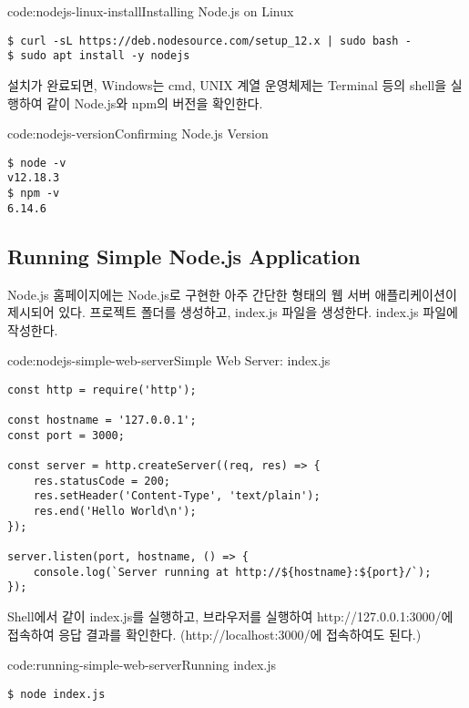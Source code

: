 \begin{codeenv}{code:nodejs-linux-install}{Installing Node.js on Linux}\begin{verbatim}
$ curl -sL https://deb.nodesource.com/setup_12.x | sudo bash -
$ sudo apt install -y nodejs
\end{verbatim}
\end{codeenv}

설치가 완료되면, Windows는 cmd, UNIX 계열 운영체제는 Terminal 등의 shell을 실행하여 \과 같이 Node.js와 npm의 버전을 확인한다.

\begin{codeenv}{code:nodejs-version}{Confirming Node.js Version}\begin{verbatim}
$ node -v
v12.18.3
$ npm -v
6.14.6
\end{verbatim}
\end{codeenv}

\subsection*{Running Simple Node.js Application}
Node.js 홈페이지에는 Node.js로 구현한 아주 간단한 형태의 웹 서버 애플리케이션이 제시되어 있다. 프로젝트 폴더를 생성하고, index.js 파일을 생성한다. index.js 파일에 \를 작성한다.

\begin{codeenv}{code:nodejs-simple-web-server}{Simple Web Server: index.js}\begin{verbatim}
const http = require('http');

const hostname = '127.0.0.1';
const port = 3000;

const server = http.createServer((req, res) => {
    res.statusCode = 200;
    res.setHeader('Content-Type', 'text/plain');
    res.end('Hello World\n');
});

server.listen(port, hostname, () => {
    console.log(`Server running at http://${hostname}:${port}/`);
});
\end{verbatim}
\end{codeenv}

Shell에서 \와 같이 index.js를 실행하고, 브라우저를 실행하여 http://127.0.0.1:3000/에 접속하여 응답 결과를 확인한다. (http://localhost:3000/에 접속하여도 된다.)

\begin{codeenv}{code:running-simple-web-server}{Running index.js}\begin{verbatim}
$ node index.js
\end{verbatim}
\end{codeenv}
